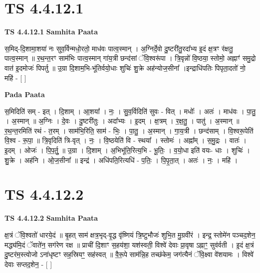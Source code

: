 \documentclass[17pt]{extarticle}
\begin{document}
\section*{ TS 4.4.12.1 }

\textbf{TS 4.4.12.1 } \newline
\textbf{Samhita Paata} \newline

स॒मिद्-दि॒शामा॒शया॑ नः सुव॒र्विन्मधो॒रतो॒ माध॑वः पात्व॒स्मान् । अ॒ग्निर्दे॒वो दु॒ष्टरी॑तु॒रदा᳚भ्य इ॒दं क्ष॒त्रꣳ र॑क्षतु॒ पात्व॒स्मान् ॥ र॒थ॒न्त॒रꣳ साम॑भिः पात्व॒स्मान् गा॑य॒त्री छन्द॑सां ॅवि॒श्वरू॑पा । त्रि॒वृन्नो॑ वि॒ष्ठया॒ स्तोमो॒ अह्नाꣳ॑ समु॒द्रो वात॑ इ॒दमोजः॑ पिपर्तु ॥ उ॒ग्रा दि॒शाम॒भि-भू॑तिर्वयो॒धाः शुचिः॑ शु॒क्रे अह॑न्योज॒सीना᳚ ।इन्द्राधि॑पतिः पिपृता॒दतो॑ नो॒ महि॑ - [  ] \newline

\textbf{Pada Paata} \newline

स॒मिदिति॑ सम् - इत् । दि॒शाम् । आ॒शया᳚ । नः॒ । सु॒व॒र्विदिति॑ सुवः - वित् । मधोः᳚ । अतः॑ । माध॑वः । पा॒तु॒ । अ॒स्मान् ॥ अ॒ग्निः । दे॒वः । दु॒ष्टरी॑तुः । अदा᳚भ्यः । इ॒दम् । क्ष॒त्रम् । र॒क्ष॒तु॒ । पातु॑ । अ॒स्मान् ॥ र॒थ॒न्त॒रमिति॑ रथं - त॒रम् । साम॑भि॒रिति॒ साम॑ - भिः॒ । पा॒तु॒ । अ॒स्मान् । गा॒य॒त्री । छन्द॑साम् । वि॒श्वरू॒पेति॑ वि॒श्व - रू॒पा॒ ॥ त्रि॒वृदिति॑ त्रि-वृत् । नः॒ । वि॒ष्ठयेति॑ वि - स्थया᳚ । स्तोमः॑ । अह्ना᳚म् । स॒मु॒द्रः । वातः॑ । इ॒दम् । ओजः॑ । पि॒प॒र्तु॒ ॥ उ॒ग्रा । दि॒शाम् । अ॒भिभू॑ति॒रित्य॒भि - भू॒तिः॒ । व॒यो॒धा इति॑ वयः- धाः । शुचिः॑ । शु॒क्रे । अह॑नि । ओ॒ज॒सीना᳚ ॥ इन्द्र॑ । अधि॑पति॒रित्यधि॑ - प॒तिः॒ । पि॒पृ॒ता॒त् । अतः॑ । नः॒ । महि॑ ।  \newline




\section*{ TS 4.4.12.2 }

\textbf{TS 4.4.12.2 } \newline
\textbf{Samhita Paata} \newline

क्ष॒त्रं ॅवि॒श्वतो॑ धारये॒दं ॥ बृ॒हत् साम॑ क्षत्र॒भृद्-वृ॒द्ध वृ॑ष्णियं त्रि॒ष्टुभौजः॑ शुभि॒त मु॒ग्रवी॑रं । इन्द्र॒ स्तोमे॑न पञ्चद॒शेन॒ मद्ध्य॑मि॒दं ॅवाते॑न॒ सग॑रेण रक्ष ॥ प्राची॑ दि॒शाꣳ स॒हय॑शा॒ यश॑स्वती॒ विश्वे॑ देवाः प्रा॒वृषा ऽह्नाꣳ॒॒ सुव॑र्वती । इ॒दं क्ष॒त्रं दु॒ष्टर॑म॒स्त्वोजो ऽना॑धृष्टꣳ सह॒स्रियꣳ॒॒ सह॑स्वत् ॥ वै॒रू॒पे साम॑न्नि॒ह तच्छ॑केम॒ जग॑त्यैनं ॅवि॒क्ष्वा वे॑शयामः । विश्वे॑ देवाः सप्तद॒शेन॒ - [  ] \newline
\end{document}
